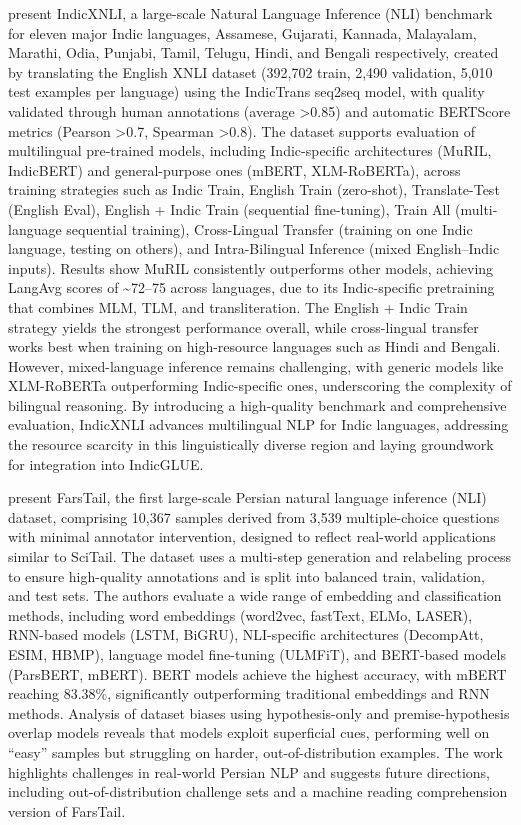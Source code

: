 \documentclass[acmsmall]{acmart}
\begin{document}
\cite{aggarwal2022indicxnlievaluatingmultilingualinference} present IndicXNLI, a large-scale Natural Language Inference (NLI) benchmark for eleven major Indic languages, Assamese, Gujarati, Kannada, Malayalam, Marathi, Odia, Punjabi, Tamil, Telugu, Hindi, and Bengali respectively, created by translating the English XNLI dataset (392,702 train, 2,490 validation, 5,010 test examples per language) using the IndicTrans seq2seq model, with quality validated through human annotations (average >0.85) and automatic BERTScore metrics (Pearson >0.7, Spearman >0.8). The dataset supports evaluation of multilingual pre-trained models, including Indic-specific architectures (MuRIL, IndicBERT) and general-purpose ones (mBERT, XLM-RoBERTa), across training strategies such as Indic Train, English Train (zero-shot), Translate-Test (English Eval), English + Indic Train (sequential fine-tuning), Train All (multi-language sequential training), Cross-Lingual Transfer (training on one Indic language, testing on others), and Intra-Bilingual Inference (mixed English–Indic inputs). Results show MuRIL consistently outperforms other models, achieving LangAvg scores of \textasciitilde72–75 across languages, due to its Indic-specific pretraining that combines MLM, TLM, and transliteration. The English + Indic Train strategy yields the strongest performance overall, while cross-lingual transfer works best when training on high-resource languages such as Hindi and Bengali. However, mixed-language inference remains challenging, with generic models like XLM-RoBERTa outperforming Indic-specific ones, underscoring the complexity of bilingual reasoning. By introducing a high-quality benchmark and comprehensive evaluation, IndicXNLI advances multilingual NLP for Indic languages, addressing the resource scarcity in this linguistically diverse region and laying groundwork for integration into IndicGLUE. 


\citep{Amirkhani_2023} present FarsTail, the first large-scale Persian natural language inference (NLI) dataset, comprising 10,367 samples derived from 3,539 multiple-choice questions with minimal annotator intervention, designed to reflect real-world applications similar to SciTail. The dataset uses a multi-step generation and relabeling process to ensure high-quality annotations and is split into balanced train, validation, and test sets. The authors evaluate a wide range of embedding and classification methods, including word embeddings (word2vec, fastText, ELMo, LASER), RNN-based models (LSTM, BiGRU), NLI-specific architectures (DecompAtt, ESIM, HBMP), language model fine-tuning (ULMFiT), and BERT-based models (ParsBERT, mBERT). BERT models achieve the highest accuracy, with mBERT reaching 83.38\%, significantly outperforming traditional embeddings and RNN methods. Analysis of dataset biases using hypothesis-only and premise-hypothesis overlap models reveals that models exploit superficial cues, performing well on “easy” samples but struggling on harder, out-of-distribution examples. The work highlights challenges in real-world Persian NLP and suggests future directions, including out-of-distribution challenge sets and a machine reading comprehension version of FarsTail.
\end{document}
